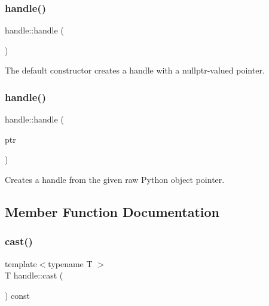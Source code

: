 \subsubsection{\texorpdfstring{handle()}{handle()}\hspace{0.1cm}{\footnotesize\ttfamily [1/2]}}
{\footnotesize\ttfamily handle\+::handle (\begin{DoxyParamCaption}{ }\end{DoxyParamCaption})\hspace{0.3cm}{\ttfamily [default]}}



The default constructor creates a handle with a {\ttfamily nullptr}-\/valued pointer. 

\mbox{\label{classhandle_a99eb912e1b9b823bc447980a16772584}} 
\subsubsection{\texorpdfstring{handle()}{handle()}\hspace{0.1cm}{\footnotesize\ttfamily [2/2]}}
{\footnotesize\ttfamily handle\+::handle (\begin{DoxyParamCaption}\item[{\mbox{\hyperlink{_python27_2object_8h_aadc84ac7aed2cfa6f20c25f62bf3dac7}{Py\+Object}} $\ast$}]{ptr }\end{DoxyParamCaption})\hspace{0.3cm}{\ttfamily [inline]}}



Creates a {\ttfamily handle} from the given raw Python object pointer. 



\subsection{Member Function Documentation}
\mbox{\label{classhandle_a8158ff37b59a73d48140ab4d718316b9}} 
\subsubsection{\texorpdfstring{cast()}{cast()}\hspace{0.1cm}{\footnotesize\ttfamily [1/2]}}
{\footnotesize\ttfamily template$<$typename T $>$ \\
T handle\+::cast (\begin{DoxyParamCaption}{ }\end{DoxyParamCaption}) const}

